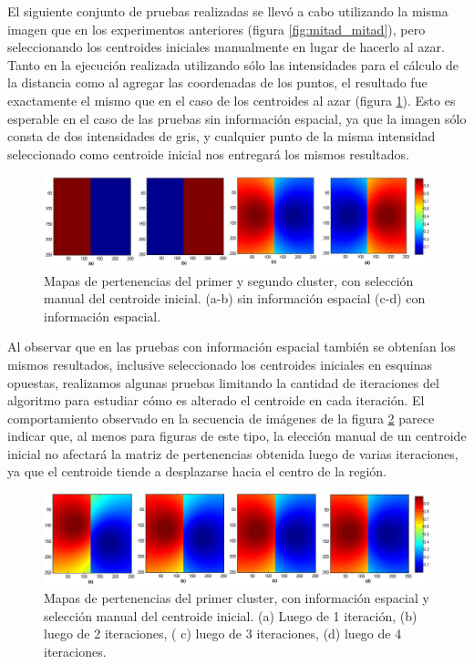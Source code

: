 El siguiente conjunto de pruebas realizadas se llevó a cabo utilizando la misma imagen que en los experimentos anteriores (figura \ref{fig:mitad_mitad}), pero seleccionando los centroides iniciales manualmente en lugar de hacerlo al azar. Tanto en la ejecución realizada utilizando sólo las intensidades para el cálculo de la distancia como al agregar las coordenadas de los puntos, el resultado fue exactamente el mismo que en el caso de los centroides al azar (figura \ref{fig:ejecucion_mitad_mitad_centroides_manuales}). Esto es esperable en el caso de las pruebas sin información espacial, ya que la imagen sólo consta de dos intensidades de gris, y cualquier punto de la misma intensidad seleccionado como centroide inicial nos entregará los mismos resultados.

\begin{figure}[H]
\centering
\includegraphics[scale=0.08]{images/mitad_mitad_001.jpg}
\caption{Mapas de pertenencias del primer y segundo cluster, con selección manual del centroide inicial. (a-b) sin información espacial (c-d) con información espacial.}
\label{fig:ejecucion_mitad_mitad_centroides_manuales}
\end{figure}

Al observar que en las pruebas con información espacial también se obtenían los mismos resultados, inclusive  seleccionado los centroides iniciales en esquinas opuestas, realizamos algunas pruebas limitando la cantidad de iteraciones del algoritmo para estudiar cómo es alterado el centroide en cada iteración. El comportamiento observado en la secuencia de imágenes de la figura \ref{fig:ejecucion_mitad_mitad_iteraciones} parece indicar que, al menos para figuras de este tipo, la elección manual de un centroide inicial no afectará la matriz de pertenencias obtenida luego de varias iteraciones, ya que el centroide tiende a desplazarse hacia el centro de la región.

\begin{figure}[H]
\centering
\includegraphics[scale=0.08]{images/mitad_mitad_iteracion_x1.jpg}
\caption{Mapas de pertenencias del primer cluster, con información espacial y selección manual del centroide inicial. (a) Luego de 1 iteración, (b) luego de 2 iteraciones, ( c) luego de 3 iteraciones, (d) luego de 4 iteraciones.}
\label{fig:ejecucion_mitad_mitad_iteraciones}
\end{figure}

